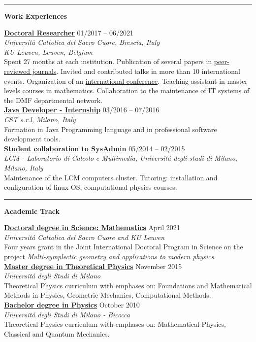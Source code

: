 \documentclass[a4paper]{article}
\newcommand{\block}[1]{\hrule \vspace{0.2cm} \textbf{\Large #1} \vspace{0.2cm}}
\newcommand{\voice}[5]{\href{#4}{\textbf{#1}} \hfill #2 \\ \textit{#3} \\ {\small #5} \vspace{0.2cm} \\}
\begin{document}
\begin{minipage}[t]{0.6\columnwidth}

    \block{Work Experiences}
   
 
    \voice{Doctoral Researcher}
    	{01/2017 -- 06/2021}
    	{Università Cattolica del Sacro Cuore, Brescia, Italy \\ KU Leuven, Leuven, Belgium}
    	{https://scuoledidottorato.unicatt.it/phdschools/science-10574.html}
    	{Spent 27 months at each institution.
		Publication of several papers in \href{https://orcid.org/0000-0002-8829-1943}{peer-reviewed journals}. 
		Invited and contributed talks in more than 10 international events. 
		Organization of an \href{https://wis.kuleuven.be/events/multisymplectic}{international conference}.
		Teaching assistant in master levels courses in mathematics.
		Collaboration to the maintenance of IT systems of the DMF departmental network.}	
    \voice{Java Developer - Internship}
        {03/2016  -- 07/2016}
        {CST s.r.l, Milano, Italy}
        {https://www.csttech.it/}       
        {Formation in Java Programming language and in professional software development tools.}
    \voice{Student collaboration to SysAdmin}
        {05/2014 -- 02/2015}
        {LCM - Laboratorio di Calcolo e Multimedia, Universit\'a degli studi di Milano, Milano, Italy}
        {https://lcm.mi.infn.it/}       
        {Maintenance of the LCM computers cluster. Tutoring: installation and configuration of linux OS, computational physics courses.\vspace{-0.25cm}}
 

    \block{Academic Track}

    
    \voice{Doctoral degree in Science: Mathematics}
        {April 2021}
        {Universit\'a Cattolica del Sacro Cuore and KU Leuven}
        {https://web.archive.org/save/http://scuoledidottorato.unicatt.it/phdschools/science-research-projects}       
        {Four years grant in the Joint International Doctoral Program in Science on the project \emph{Multi-symplectic geometry and applications to modern physics}. }
    \voice{Master degree in Theoretical Physics}
        {November 2015}
        {Universit\'a degli Studi di Milano}
        {https://fisica-lm.cdl.unimi.it/it}       
        {Theoretical Physics curriculum with emphases on: Foundations and Mathematical Methods in Physics, Geometric Mechanics, Computational Methods.}
    \voice{Bachelor degree in Physics}
        {October 2010}
        {Universit\'a degli Studi di Milano - Bicocca}
        {https://www.fisica.unimib.it/en}       
        {Theoretical Physics curriculum with emphases on: Mathematical-Physics, Classical and Quantum Mechanics.\vspace{-0.25cm}}

















\end{minipage} 
\end{document}
